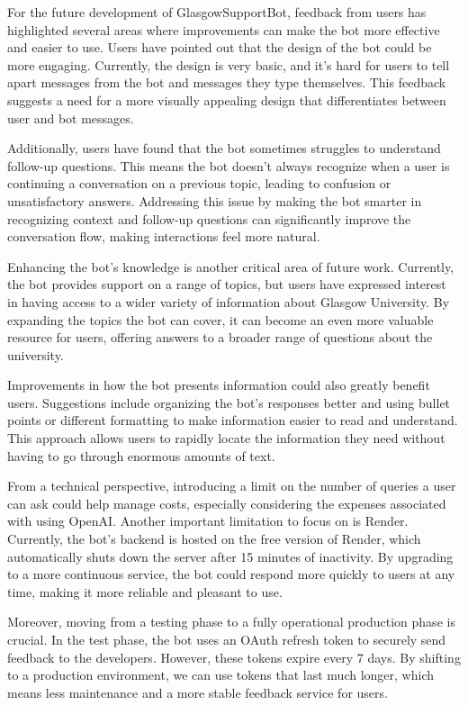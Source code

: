\documentclass{l4proj}
\begin{document}
For the future development of GlasgowSupportBot, feedback from users has highlighted several areas where improvements can make the bot more effective and easier to use. Users have pointed out that the design of the bot could be more engaging. Currently, the design is very basic, and it's hard for users to tell apart messages from the bot and messages they type themselves. This feedback suggests a need for a more visually appealing design that differentiates between user and bot messages.

Additionally, users have found that the bot sometimes struggles to understand follow-up questions. This means the bot doesn't always recognize when a user is continuing a conversation on a previous topic, leading to confusion or unsatisfactory answers. Addressing this issue by making the bot smarter in recognizing context and follow-up questions can significantly improve the conversation flow, making interactions feel more natural.

Enhancing the bot's knowledge is another critical area of future work. Currently, the bot provides support on a range of topics, but users have expressed interest in having access to a wider variety of information about Glasgow University. By expanding the topics the bot can cover, it can become an even more valuable resource for users, offering answers to a broader range of questions about the university.

Improvements in how the bot presents information could also greatly benefit users. Suggestions include organizing the bot's responses better and using bullet points or different formatting to make information easier to read and understand. This approach allows users to rapidly locate the information they need without having to go through enormous amounts of text.

From a technical perspective, introducing a limit on the number of queries a user can ask could help manage costs, especially considering the expenses associated with using  OpenAI. Another important limitation to focus on is Render. Currently, the bot's backend is hosted on the free version of Render, which automatically shuts down the server after 15 minutes of inactivity. By upgrading to a more continuous service, the bot could respond more quickly to users at any time, making it more reliable and pleasant to use.

Moreover, moving from a testing phase to a fully operational production phase is crucial. In the test phase, the bot uses an OAuth refresh token to securely send feedback to the developers. However, these tokens expire every 7 days. By shifting to a production environment, we can use tokens that last much longer, which means less maintenance and a more stable feedback service for users.
\end{document}
